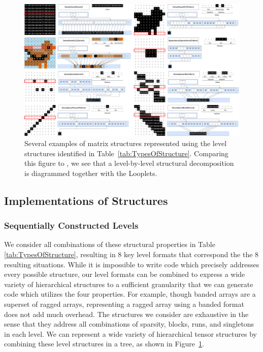     \begin{figure}[htbp]
        \centering
        \includegraphics[width=\linewidth]{Structures.png}\hfill%
        \vspace{-8pt}
        \caption{Several examples of matrix structures represented using the
        level structures identified in Table~\ref{tab:TypesOfStructure}.
        Comparing this figure to \cite[Figure 3]{ahrens_looplets_2023}, we see
        that a level-by-level structural decomposition is diagrammed together
        with the Looplets.}
        \label{fig:structuraldiversity}
        \vspace{-18pt}
    \end{figure}

\subsection{Implementations of Structures}
\subsubsection{Sequentially Constructed Levels}
   We consider all combinations of these structural properties in Table
    \ref{tab:TypesOfStructure}, resulting in 8 key level formats that correspond
    the the 8 resulting situations. 
    While it is impossible to write code which
    precisely addresses every possible structure, our level
    formats can be combined to express a wide variety of hierarchical structures to a
    sufficient granularity that we can generate code which utilizes the four
    properties.  For example, though banded arrays are a superset of ragged
    arrays, representing a ragged array using a banded format does not add much
    overhead.  The structures we consider are exhaustive in the sense that they
    address all combinations of sparsity, blocks, runs, and singletons in each
    level. We can represent a wide variety of hierarchical tensor structures by
    combining these level structures in a tree, as shown in
    Figure~\ref{fig:structuraldiversity}.

